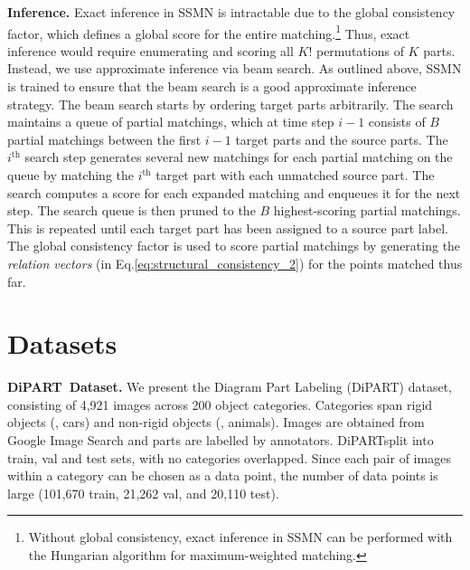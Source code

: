 \documentclass[10pt,twocolumn,letterpaper]{article}
\newcommand{\dataset}{\mbox{DiPART}}
\begin{document}
\vspace{.5em}\noindent\textbf{Inference.}
Exact inference in SSMN is intractable due to the global consistency factor, which defines a global score for the entire matching.\footnote{Without global consistency, exact inference in SSMN can be performed with the Hungarian algorithm for maximum-weighted matching.} Thus, exact inference would require enumerating and scoring all $K!$ permutations of $K$ parts. Instead, we use approximate inference via beam search. As outlined above, SSMN is trained to ensure that the beam search is a good approximate inference strategy. The beam search starts by ordering target parts arbitrarily. The search maintains a queue of partial matchings, which at time step $i - 1$ consists of $B$ partial matchings between the first $i-1$ target parts and the source parts. The $i^\text{th}$ search step generates several new matchings for each partial matching on the queue by matching the $i^\text{th}$ target part with each unmatched source part. The search computes a score for each expanded matching and enqueues it for the next step. The search queue is then pruned to the $B$ highest-scoring partial matchings. This is repeated until each target part has been assigned to a source part label. The global consistency factor is used to score partial matchings by generating the \emph{relation vectors} (in Eq.\ref{eq:structural_consistency_2}) for the points matched thus far.


\section{Datasets}
\label{sec:dataset}
\noindent\textbf{\dataset\ Dataset.}
We present the Diagram Part Labeling (\dataset) dataset, consisting of 4,921 images across 200 object categories. Categories span rigid objects (\eg, cars) and non-rigid objects (\eg, animals). Images are obtained from Google Image Search and parts are labelled by annotators. \dataset\is split into train, val and test sets, with no categories overlapped. Since each pair of images within a category can be chosen as a data point, the number of data points is large (101,670 train, 21,262 val, and 20,110 test).
\end{document}
